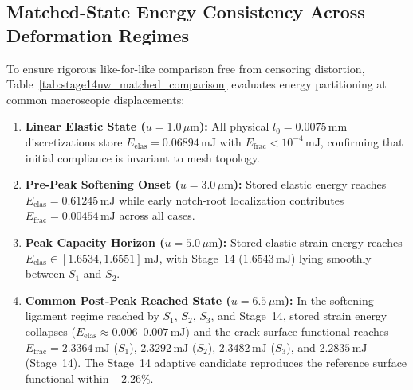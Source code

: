 \subsection{Matched-State Energy Consistency Across Deformation Regimes}
\label{subsec:stage14uw_matched_states}

To ensure rigorous like-for-like comparison free from censoring distortion, Table~\ref{tab:stage14uw_matched_comparison} evaluates energy partitioning at common macroscopic displacements:
\begin{enumerate}
    \item \textbf{Linear Elastic State ($u = 1.0\,\mu\mathrm{m}$):} All physical $l_0 = 0.0075\,\mathrm{mm}$ discretizations store $E_{\mathrm{elas}} = 0.06894\,\mathrm{mJ}$ with $E_{\mathrm{frac}} < 10^{-4}\,\mathrm{mJ}$, confirming that initial compliance is invariant to mesh topology.
    \item \textbf{Pre-Peak Softening Onset ($u = 3.0\,\mu\mathrm{m}$):} Stored elastic energy reaches $E_{\mathrm{elas}} = 0.61245\,\mathrm{mJ}$ while early notch-root localization contributes $E_{\mathrm{frac}} = 0.00454\,\mathrm{mJ}$ across all cases.
    \item \textbf{Peak Capacity Horizon ($u = 5.0\,\mu\mathrm{m}$):} Stored elastic strain energy reaches $E_{\mathrm{elas}} \in [1.6534, 1.6551]\,\mathrm{mJ}$, with Stage~14 ($1.6543\,\mathrm{mJ}$) lying smoothly between $S_1$ and $S_2$.
    \item \textbf{Common Post-Peak Reached State ($u = 6.5\,\mu\mathrm{m}$):} In the softening ligament regime reached by $S_1$, $S_2$, $S_3$, and Stage~14, stored strain energy collapses ($E_{\mathrm{elas}} \approx 0.006\text{--}0.007\,\mathrm{mJ}$) and the crack-surface functional reaches $E_{\mathrm{frac}} = 2.3364\,\mathrm{mJ}$ ($S_1$), $2.3292\,\mathrm{mJ}$ ($S_2$), $2.3482\,\mathrm{mJ}$ ($S_3$), and $2.2835\,\mathrm{mJ}$ (Stage~14). The Stage~14 adaptive candidate reproduces the reference surface functional within \textbf{$-2.26\%$}.
\end{enumerate}

